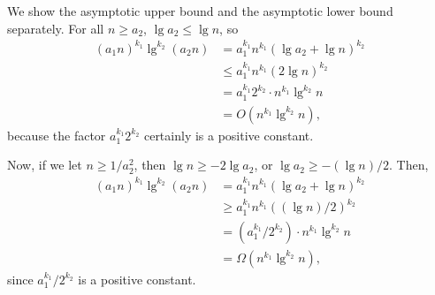We show the asymptotic upper bound and the asymptotic lower bound separately.
For all $n\ge a_2$, $\lg a_2\le\lg n$, so
\begin{align*}
    (a_1n)^{k_1}\lg^{k_2}(a_2n) &= a_1^{k_1}n^{k_1}(\lg a_2+\lg n)^{k_2} \\
    &\le a_1^{k_1}n^{k_1}(2\lg n)^{k_2} \\
    &= a_1^{k_1}2^{k_2}\cdot n^{k_1}\lg^{k_2}n \\
    &= O(n^{k_1}\lg^{k_2}n),
\end{align*}
because the factor $a_1^{k_1}2^{k_2}$ certainly is a positive constant.

Now, if we let $n\ge1/a_2^2$, then $\lg n\ge-2\lg a_2$, or $\lg a_2\ge-(\lg n)/2$.
Then,
\begin{align*}
    (a_1n)^{k_1}\lg^{k_2}(a_2n) &= a_1^{k_1}n^{k_1}(\lg a_2+\lg n)^{k_2} \\
    &\ge a_1^{k_1}n^{k_1}((\lg n)/2)^{k_2} \\
    &= (a_1^{k_1}\!/2^{k_2})\cdot n^{k_1}\lg^{k_2}n \\
    &= \Omega(n^{k_1}\lg^{k_2}n),
\end{align*}
since $a_1^{k_1}\!/2^{k_2}$ is a positive constant.

